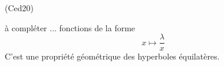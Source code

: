 \begin{tiny}(Ced20)\end{tiny} à compléter ... fonctions de la forme
\begin{displaymath}
  x\mapsto \frac{\lambda}{x}
\end{displaymath}
C'est une propriété géométrique des hyperboles équilatères.